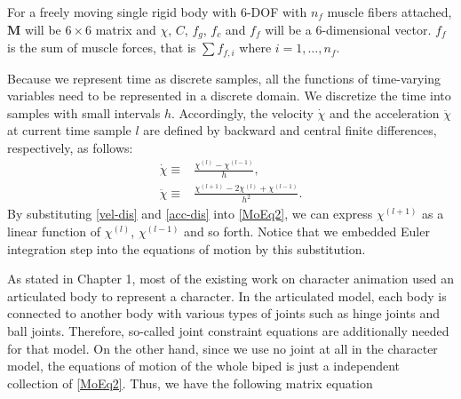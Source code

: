 \documentclass[master,english,final]{kaist-ucs}
\begin{document}
For a freely moving single
rigid body with 6-DOF with $n_f$ muscle fibers attached,
$\mathbf{M}$ will be $6\times 6$ matrix and $\chi$,
$C$, $f_g$, $f_c$ and $f_f$ will be a 6-dimensional vector. $f_f$ is the sum of
muscle forces, that is $\sum f_{f,i}$ where $i=1,\dots,n_f$.

Because we represent time as discrete samples, all the functions of
time-varying variables need to be represented in a discrete domain.
We discretize the time into samples with small intervals $h$. Accordingly,
the velocity $\dot\chi$ and the acceleration $\ddot\chi$ at current
time sample $l$ are defined by backward and central finite differences, respectively,
as follows:
\begin{align}
\dot\chi  \equiv {} & \frac{\chi^{(l)}-\chi^{(l-1)}}{h}\label{vel-dis},\\
\ddot\chi \equiv {} & \frac{\chi^{(l+1)}-2\chi^{(l)}+\chi^{(l-1)}}{h^2}.\label{acc-dis}
\end{align}
By substituting \eqref{vel-dis} and \eqref{acc-dis} into \eqref{MoEq2},
we can express $\chi^{(l+1)}$ as a linear function of $\chi^{(l)}$, $\chi^{(l-1)}$ and so forth.
Notice that we embedded Euler integration step into the equations of motion by this substitution.

As stated in Chapter 1, most of the existing work on
character animation used an articulated body to represent a character.
In the articulated model, each body is connected to another body with
various types of joints such as hinge joints and ball joints.
Therefore, so-called joint constraint equations are additionally
needed for that model.
On the other hand, since we use no joint at all in the character
model, the equations of motion of the whole biped is just a independent collection of
\eqref{MoEq2}. Thus, we have the following matrix equation
\end{document}
